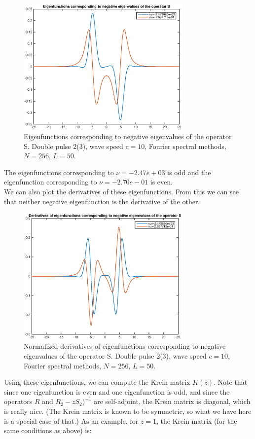 \documentclass[12pt]{article}
\begin{document}
\begin{figure}[H]
	\includegraphics[width=8.5cm]{dp2vNeg}
	\caption{Eigenfunctions corresponding to negative eigenvalues of the operator S. Double pulse 2(3), wave speed $c = 10$, Fourier spectral methods, $N = 256$, $L = 50$.}
\end{figure}

The eigenfunctions corresponding to $\nu = -2.47e+03$ is odd and the eigenfunction corresponding to $\nu=-2.70e-01$ is even.\\

We can also plot the derivatives of these eigenfunctions. From this we can see that neither negative eigenfunction is the derivative of the other.

\begin{figure}[H]
	\includegraphics[width=8.5cm]{dp2dvNeg}
	\caption{Normalized derivatives of eigenfunctions corresponding to negative eigenvalues of the operator S. Double pulse 2(3), wave speed $c = 10$, Fourier spectral methods, $N = 256$, $L = 50$.}
\end{figure}

Using these eigenfunctions, we can compute the Krein matrix $K(z)$. Note that since one eigenfunction is even and one eigenfunction is odd, and since the operators $R$ and $R_2 - zS_2 )^{-1}$ are self-adjoint, the Krein matrix is diagonal, which is really nice. (The Krein matrix is known to be symmetric, so what we have here is a special case of that.) As an example, for $z = 1$, the Krein matrix (for the same conditions as above) is:
\end{document}
